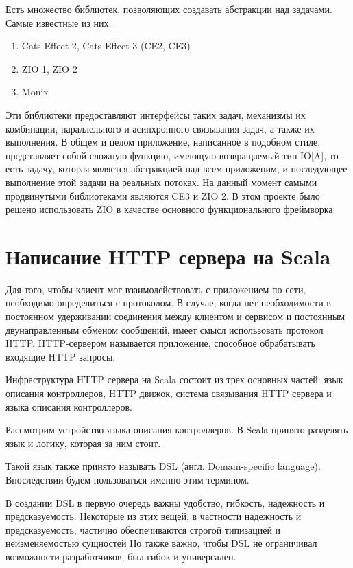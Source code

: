 \documentclass[14pt]{extarticle}
\begin{document}
    Есть множество библиотек, позволяющих создавать абстракции над задачами. Самые известные из них:

    \begin{enumerate}
        \item Cats Effect 2, Cats Effect 3 (CE2, CE3)
        \item ZIO 1, ZIO 2
        \item Monix
    \end{enumerate}

    Эти библиотеки предоставляют интерфейсы таких задач, механизмы их комбинации, параллельного и асинхронного связывания задач,
    а также их выполнения.
    В общем и целом приложение, написанное в подобном стиле, представляет собой
    сложную функцию, имеющую возвращаемый тип IO[A], то есть задачу, которая является абстракцией над всем приложеним,
    и последующее выполнение этой задачи на реальных потоках.
    На данный момент самыми продвинутыми библиотеками являются CE3 и ZIO 2.
    В этом проекте было решено использовать ZIO\cite{zio} в качестве основного функционального фреймворка.

    \section{Написание HTTP сервера на Scala}

    Для того, чтобы клиент мог взаимодействовать с приложением по сети, необходимо определиться с протоколом. В случае,
    когда нет необходимости в постоянном удерживании соединения между клиентом и сервисом и постоянным двунаправленным
    обменом сообщений, имеет смысл использовать протокол HTTP. HTTP-сервером называется приложение, способное обрабатывать
    входящие HTTP запросы.

    Инфраструктура HTTP сервера на Scala состоит из трех основных частей: язык описания контроллеров, HTTP движок, система
    связывания HTTP сервера и языка описания контроллеров.

    Рассмотрим устройство языка описания контроллеров. В Scala принято  разделять язык и логику, которая за ним стоит.

    Такой язык также принято называть DSL (англ. Domain-specific language). Впоследствии будем пользоваться именно этим термином.

    В создании DSL в первую очередь важны удобство, гибкость, надежность и
    предсказуемость. Некоторые из этих вещей, в частности надежность и предсказуемость, частично обеспечиваются строгой
    типизацией и
    неизменяемостью сущностей
    Но также важно, чтобы DSL не ограничивал возможности разработчиков, был гибок и универсален.
\end{document}
